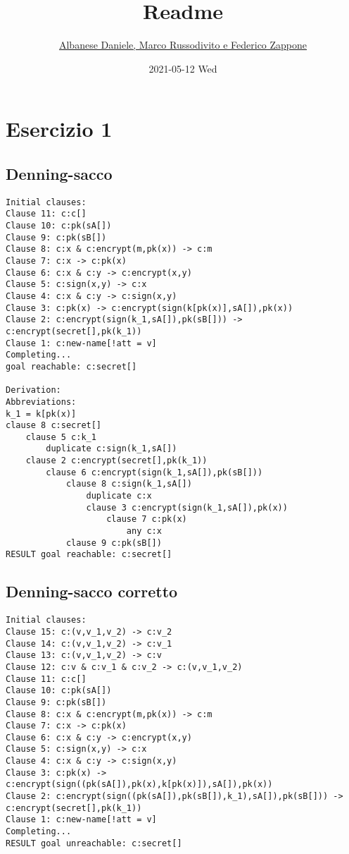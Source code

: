 \documentclass[11pt]{article}
\author{\href{mailto:f.zappone1@studenti.unimol.it}{Albanese Daniele, Marco Russodivito e Federico Zappone}}
\date{2021-05-12 Wed}
\title{Readme}
\begin{document}
\maketitle
\tableofcontents


\section{Esercizio 1}
\label{sec:orgcc617c2}
\subsection{Denning-sacco}
\label{sec:orgeec6547}
\begin{verbatim}
Initial clauses:
Clause 11: c:c[]
Clause 10: c:pk(sA[])
Clause 9: c:pk(sB[])
Clause 8: c:x & c:encrypt(m,pk(x)) -> c:m
Clause 7: c:x -> c:pk(x)
Clause 6: c:x & c:y -> c:encrypt(x,y)
Clause 5: c:sign(x,y) -> c:x
Clause 4: c:x & c:y -> c:sign(x,y)
Clause 3: c:pk(x) -> c:encrypt(sign(k[pk(x)],sA[]),pk(x))
Clause 2: c:encrypt(sign(k_1,sA[]),pk(sB[])) -> c:encrypt(secret[],pk(k_1))
Clause 1: c:new-name[!att = v]
Completing...
goal reachable: c:secret[]

Derivation:
Abbreviations:
k_1 = k[pk(x)]
clause 8 c:secret[]
    clause 5 c:k_1
        duplicate c:sign(k_1,sA[])
    clause 2 c:encrypt(secret[],pk(k_1))
        clause 6 c:encrypt(sign(k_1,sA[]),pk(sB[]))
            clause 8 c:sign(k_1,sA[])
                duplicate c:x
                clause 3 c:encrypt(sign(k_1,sA[]),pk(x))
                    clause 7 c:pk(x)
                        any c:x
            clause 9 c:pk(sB[])
RESULT goal reachable: c:secret[]
\end{verbatim}
\subsection{Denning-sacco corretto}
\label{sec:org4efa377}
\begin{verbatim}
Initial clauses:
Clause 15: c:(v,v_1,v_2) -> c:v_2
Clause 14: c:(v,v_1,v_2) -> c:v_1
Clause 13: c:(v,v_1,v_2) -> c:v
Clause 12: c:v & c:v_1 & c:v_2 -> c:(v,v_1,v_2)
Clause 11: c:c[]
Clause 10: c:pk(sA[])
Clause 9: c:pk(sB[])
Clause 8: c:x & c:encrypt(m,pk(x)) -> c:m
Clause 7: c:x -> c:pk(x)
Clause 6: c:x & c:y -> c:encrypt(x,y)
Clause 5: c:sign(x,y) -> c:x
Clause 4: c:x & c:y -> c:sign(x,y)
Clause 3: c:pk(x) -> c:encrypt(sign((pk(sA[]),pk(x),k[pk(x)]),sA[]),pk(x))
Clause 2: c:encrypt(sign((pk(sA[]),pk(sB[]),k_1),sA[]),pk(sB[])) -> c:encrypt(secret[],pk(k_1))
Clause 1: c:new-name[!att = v]
Completing...
RESULT goal unreachable: c:secret[]
\end{verbatim}
\end{document}
